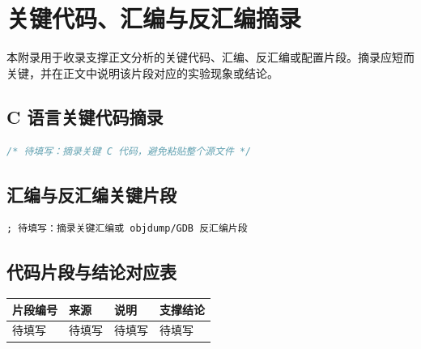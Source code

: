 \section{关键代码、汇编与反汇编摘录}

本附录用于收录支撑正文分析的关键代码、汇编、反汇编或配置片段。摘录应短而关键，并在正文中说明该片段对应的实验现象或结论。

\subsection{C 语言关键代码摘录}

\begin{lstlisting}[language=C,caption={C 语言关键代码摘录}]
/* 待填写：摘录关键 C 代码，避免粘贴整个源文件 */
\end{lstlisting}

\subsection{汇编与反汇编关键片段}

\begin{lstlisting}[language={[x86masm]Assembler},caption={汇编/反汇编关键片段}]
; 待填写：摘录关键汇编或 objdump/GDB 反汇编片段
\end{lstlisting}

\subsection{代码片段与结论对应表}

\begin{longtable}{p{2.5cm}p{4cm}p{4cm}p{4cm}}
\toprule
片段编号 & 来源 & 说明 & 支撑结论 \\
\midrule
待填写 & 待填写 & 待填写 & 待填写 \\
\bottomrule
\end{longtable}
